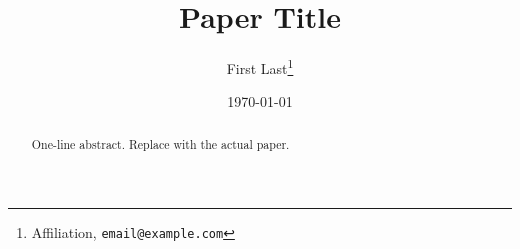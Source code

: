 \documentclass[11pt]{article}
\title{Paper Title}
\author{First Last\thanks{Affiliation, \texttt{email@example.com}}}
\date{\today}
\begin{document}
\maketitle

\begin{abstract}
  One-line abstract.
  Replace with the actual paper.
\end{abstract}



\printbibliography
\end{document}
